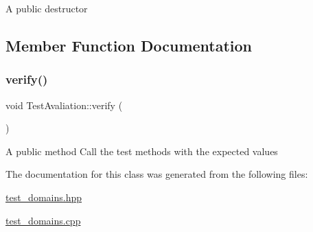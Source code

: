 A public destructor 

\subsection{Member Function Documentation}
\mbox{\label{class_test_avaliation_a8c6b9d3e1660e1cf24e335f90f22b2da}} 
\subsubsection{\texorpdfstring{verify()}{verify()}}
{\footnotesize\ttfamily void Test\+Avaliation\+::verify (\begin{DoxyParamCaption}{ }\end{DoxyParamCaption})}

A public method Call the test methods with the expected values 

The documentation for this class was generated from the following files\+:\begin{DoxyCompactItemize}
\item 
\hyperlink{test__domains_8hpp}{test\+\_\+domains.\+hpp}\item 
\hyperlink{test__domains_8cpp}{test\+\_\+domains.\+cpp}\end{DoxyCompactItemize}
